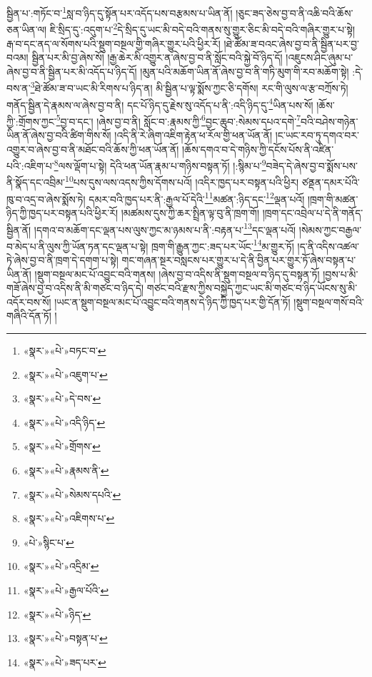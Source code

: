 སྦྱིན་པ་:གཏོང་བ་\footnote{«སྣར་»«པེ་»བཏང་བ་}སླ་བ་ཉིད་དུ་སྟོན་པར་འདོད་པས་བརྩམས་པ་ཡིན་ནོ། །ཅུང་ཟད་ཅེས་བྱ་བ་ནི་འཆི་བའི་ཆོས་ཅན་ཡིན་ལ། ཇི་སྲིད་དུ་:འདུག་པ་\footnote{«སྣར་»«པེ་»འཇུག་པ་}དེ་སྲིད་དུ་ཡང་མི་བདེ་བའི་གནས་སུ་གྱུར་ཅིང་མི་བདེ་བའི་གཞིར་གྱུར་པ་སྟེ། རྒ་བ་དང་ནད་ལ་སོགས་པའི་སྡུག་བསྔལ་གྱི་གཞིར་གྱུར་པའི་ཕྱིར་རོ། །ཐེ་ཚོམ་ཟ་བའང་ཞེས་བྱ་བ་ནི་སྦྱིན་པར་བྱ་བའམ། སྦྱིན་པར་མི་བྱ་ཞེས་སོ། །རྒྱ་ཆེར་མི་འགྱུར་ན་ཞེས་བྱ་བ་ནི་སློང་བའི་སྐྱེ་བོ་ཉིད་དོ། །འཇུངས་ཤིང་ཞུམ་པ་ཞེས་བྱ་བ་ནི་སྦྱིན་པར་མི་འདོད་པ་ཉིད་དོ། །མུན་པའི་མཆོག་ཡིན་ནོ་ཞེས་བྱ་བ་ནི་གཏི་མུག་གི་རབ་མཆོག་སྟེ། :དེ་བས་ན་\footnote{«སྣར་»«པེ་»དེ་བས་}ཐེ་ཚོམ་ཟ་བ་ཡང་མི་རིགས་པ་ཉིད་ན། མི་སྦྱིན་པ་ལྟ་སྨོས་ཀྱང་ཅི་དགོས། རང་གི་ལུས་ལ་རྩ་བཀྲོས་ཏེ། གནོད་སྦྱིན་དེ་རྣམས་ལ་ཞེས་བྱ་བ་ནི། དང་པོ་ཉིད་དུ་རྗེས་སུ་འདོད་པ་ནི་:འདི་ཉིད་དུ་\footnote{«སྣར་»«པེ་»འདི་ཉིད་}ཡིན་པས་སོ། །ཆོས་ཀྱི་:གྲོགས་ཀྱང་\footnote{«སྣར་»«པེ་»གྲོགས་}བྱ་བ་དང་། །ཞེས་བྱ་བ་ནི། སློང་བ་:རྣམས་ཀྱི་\footnote{«སྣར་»«པེ་»རྣམས་ནི་}བྱང་ཆུབ་:སེམས་དཔའ་དགེ་\footnote{«སྣར་»«པེ་»སེམས་དཔའི་}བའི་བཤེས་གཉེན་ཡིན་ནོ་ཞེས་བྱ་བའི་ཚིག་གིས་སོ། །འདི་ནི་རེ་ཞིག་འཇིག་རྟེན་ཕ་རོལ་གྱི་ཕན་ཡོན་ནོ། །ང་ཡང་རབ་ཏུ་དགའ་བར་འགྱུར་བ་ཞེས་བྱ་བ་ནི་མཐོང་བའི་ཆོས་ཀྱི་ཕན་ཡོན་ནོ། །ཆོས་དགའ་བ་དེ་གཉིས་ཀྱི་དངོས་པོས་ནི་འཛིན་པའི་:འཇིག་པ་\footnote{«སྣར་»«པེ་»འཇིགས་པ་}ལས་ལྡོག་པ་སྟེ། དེའི་ཕན་ཡོན་རྣམ་པ་གཉིས་བསྟན་ཏོ། །:སྙིམ་པ་\footnote{«པེ་»སྙིང་པ་}བཟེད་དེ་ཞེས་བྱ་བ་སྨོས་པས་ནི་སྣོད་དང་འབྲིམ་\footnote{«སྣར་»«པེ་»འདྲིམ་}པས་དུས་ལས་འདས་ཀྱིས་དོགས་པའོ། །འདིར་ཁྱད་པར་བསྟན་པའི་ཕྱིར། ཙནྡན་དམར་པོའི་ཁུ་བ་འདྲ་བ་ཞེས་སྨོས་ཏེ། དམར་བའི་ཁྱད་པར་ནི་:རྒྱལ་པོ་དེའི་\footnote{«སྣར་»«པེ་»རྒྱལ་པོའི་}མཚན་:ཉིད་དང་\footnote{«སྣར་»«པེ་»ཉིད་}ལྡན་པའོ། །ཁྲག་གི་མཚན་ཉིད་ཀྱི་ཁྱད་པར་བསྟན་པའི་ཕྱིར་རོ། །མཚམས་དུས་ཀྱི་ཆར་སྤྲིན་ལྟ་བུ་ནི་ཁྲག་གོ། །ཁྲག་དང་འབྲེལ་པ་དེ་ནི་གནོད་སྦྱིན་ནོ། །དགའ་བ་མཆོག་དང་ལྡན་པས་ལུས་ཀྱང་མ་ཉམས་པ་ནི་:བརྟན་པ་\footnote{«སྣར་»«པེ་»བསྟན་པ་}དང་ལྡན་པའོ། །སེམས་ཀྱང་བརྒྱལ་བ་མེད་པ་ནི་ལུས་ཀྱི་ཡོན་ཏན་དང་ལྡན་པ་སྟེ། ཁྲག་གི་རྒྱུན་ཀྱང་:ཟད་པར་ཡོང་\footnote{«སྣར་»«པེ་»ཟད་པར་}མ་གྱུར་ཏོ། །ད་ནི་འདིས་འཚལ་ཏེ་ཞེས་བྱ་བ་ནི་ཁྲག་དེ་དགག་པ་སྟེ། གང་གཞན་སྔར་བསླངས་པར་གྱུར་པ་དེ་ནི་བྱིན་པར་གྱུར་ཏོ་ཞེས་བསྟན་པ་ཡིན་ནོ། །སྡུག་བསྔལ་མང་པོ་འབྱུང་བའི་གནས། །ཞེས་བྱ་བ་འདིས་ནི་སྡུག་བསྔལ་བ་ཉིད་དུ་བསྟན་ཏོ། །བྱས་པ་མི་གཟོ་ཞེས་བྱ་བ་འདིས་ནི་མི་གཙང་བ་ཉིད་དེ། གཙང་བའི་རྫས་ཀྱིས་བསྐྱེད་ཀྱང་ཡང་མི་གཙང་བ་ཉིད་ཡོངས་སུ་མི་འདོར་བས་སོ། །ཡང་ན་སྡུག་བསྔལ་མང་པོ་འབྱུང་བའི་གནས་དེ་ཉིད་ཀྱི་ཁྱད་པར་གྱི་དོན་ཏོ། །སྡུག་བསྔལ་གསོ་བའི་གཞིའི་དོན་ཏོ། །
